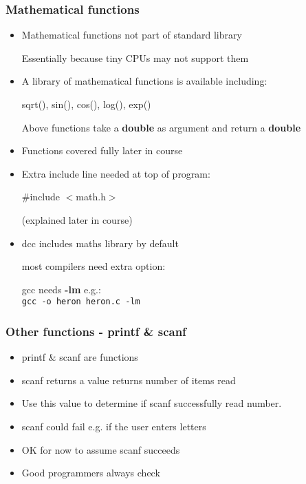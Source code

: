 \begin{frame}
\frametitle{Mathematical functions}

\begin{itemize}
\item

Mathematical functions not part of standard library

Essentially because tiny CPUs may not support them

\item

A library of mathematical functions is available including: 

sqrt(), sin(), cos(), log(), exp()

Above functions take a {\bf double} as argument and return a {\bf double}

\item

Functions covered fully later in course  

\item

Extra include line needed at top of program:

\#include $<$math.h$>$


(explained later in course)

\item

dcc includes maths library by default 

most compilers need extra option:

gcc needs {\bf -lm} e.g.:\\[2ex]
{\tt gcc -o heron heron.c -lm}
\end{itemize}


\end{frame}

\begin{frame}
\frametitle{Other functions - printf \& scanf}

\begin{itemize}
\item

printf \& scanf are functions

\item

scanf returns a value  returns number of items read

\item

Use this value to determine if scanf successfully read number.

\item

scanf could fail e.g. if the user enters letters

\item

OK for now to assume scanf succeeds

\item

Good programmers always check
\end{itemize}


\end{frame}

